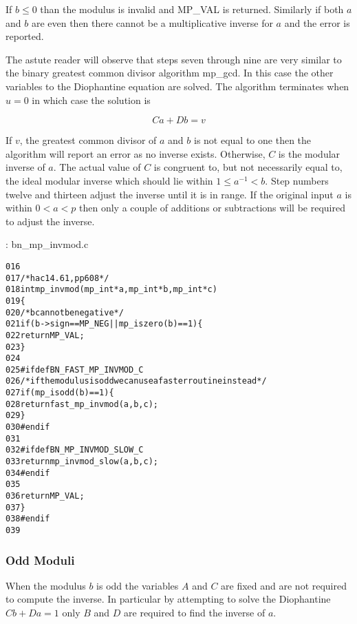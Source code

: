 \documentclass[b5paper]{book}
\begin{document}
If $b \le 0$ than the modulus is invalid and MP\_VAL is returned.  Similarly if both $a$ and $b$ are even then there cannot be a multiplicative
inverse for $a$ and the error is reported.  

The astute reader will observe that steps seven through nine are very similar to the binary greatest common divisor algorithm mp\_gcd.  In this case
the other variables to the Diophantine equation are solved.  The algorithm terminates when $u = 0$ in which case the solution is

\begin{equation}
Ca + Db = v
\end{equation}

If $v$, the greatest common divisor of $a$ and $b$ is not equal to one then the algorithm will report an error as no inverse exists.  Otherwise, $C$
is the modular inverse of $a$.  The actual value of $C$ is congruent to, but not necessarily equal to, the ideal modular inverse which should lie 
within $1 \le a^{-1} < b$.  Step numbers twelve and thirteen adjust the inverse until it is in range.  If the original input $a$ is within $0 < a < p$ 
then only a couple of additions or subtractions will be required to adjust the inverse.

\vspace{+3mm}\begin{small}
\hspace{-5.1mm}{\bf File}: bn\_mp\_invmod.c
\vspace{-3mm}
\begin{alltt}
016   
017   /* hac 14.61, pp608 */
018   int mp_invmod (mp_int * a, mp_int * b, mp_int * c)
019   \{
020     /* b cannot be negative */
021     if (b->sign == MP_NEG || mp_iszero(b) == 1) \{
022       return MP_VAL;
023     \}
024   
025   #ifdef BN_FAST_MP_INVMOD_C
026     /* if the modulus is odd we can use a faster routine instead */
027     if (mp_isodd (b) == 1) \{
028       return fast_mp_invmod (a, b, c);
029     \}
030   #endif
031   
032   #ifdef BN_MP_INVMOD_SLOW_C
033     return mp_invmod_slow(a, b, c);
034   #endif
035   
036     return MP_VAL;
037   \}
038   #endif
039   
\end{alltt}
\end{small}

\subsubsection{Odd Moduli}

When the modulus $b$ is odd the variables $A$ and $C$ are fixed and are not required to compute the inverse.  In particular by attempting to solve
the Diophantine $Cb + Da = 1$ only $B$ and $D$ are required to find the inverse of $a$.  
\end{document}
